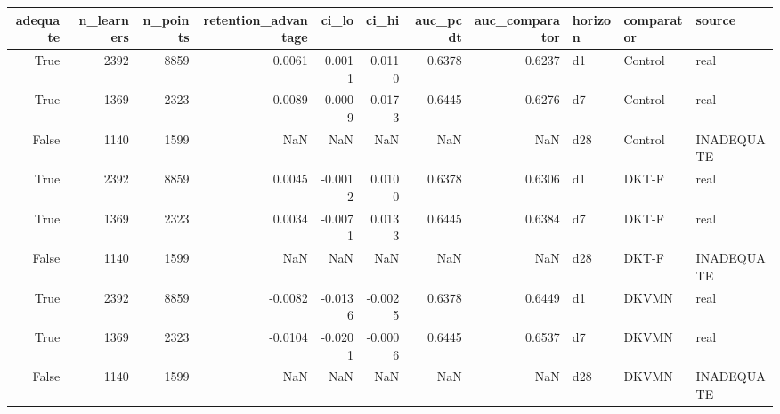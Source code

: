 \begin{tabular}{rrrrrrrrlll}
\toprule
adequate & n\_learners & n\_points & retention\_advantage & ci\_lo & ci\_hi & auc\_pcdt & auc\_comparator & horizon & comparator & source \\
\midrule
True & 2392 & 8859 & 0.0061 & 0.0011 & 0.0110 & 0.6378 & 0.6237 & d1 & Control & real \\
True & 1369 & 2323 & 0.0089 & 0.0009 & 0.0173 & 0.6445 & 0.6276 & d7 & Control & real \\
False & 1140 & 1599 & NaN & NaN & NaN & NaN & NaN & d28 & Control & INADEQUATE \\
True & 2392 & 8859 & 0.0045 & -0.0012 & 0.0100 & 0.6378 & 0.6306 & d1 & DKT-F & real \\
True & 1369 & 2323 & 0.0034 & -0.0071 & 0.0133 & 0.6445 & 0.6384 & d7 & DKT-F & real \\
False & 1140 & 1599 & NaN & NaN & NaN & NaN & NaN & d28 & DKT-F & INADEQUATE \\
True & 2392 & 8859 & -0.0082 & -0.0136 & -0.0025 & 0.6378 & 0.6449 & d1 & DKVMN & real \\
True & 1369 & 2323 & -0.0104 & -0.0201 & -0.0006 & 0.6445 & 0.6537 & d7 & DKVMN & real \\
False & 1140 & 1599 & NaN & NaN & NaN & NaN & NaN & d28 & DKVMN & INADEQUATE \\
\bottomrule
\end{tabular}
